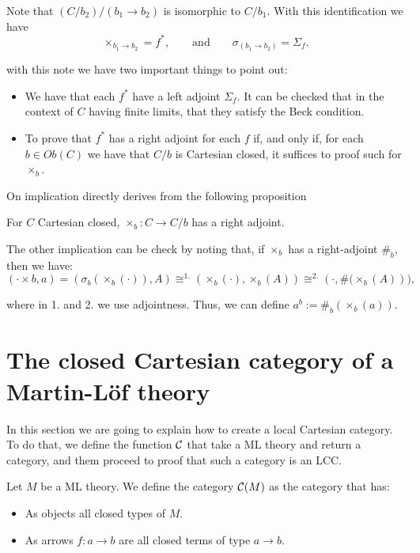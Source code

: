 Note that $(C/b_2)/(b_1\to b_2)$ is isomorphic to $C/b_1$. With this identification we have $$\times_{b_1\to b_2} = f^*,\qquad \text{and} \qquad\sigma_{(b_1\to b_2)} = \Sigma_f.$$

with this note we have two important things to point out:
\begin{itemize}
\item We have that each $f^*$ have a left adjoint $\Sigma_f$. It can be checked that in the context of $C$ having finite limits, that they satisfy the Beck condition. 
\item To prove that $f^*$ has a right adjoint for each $f$ if, and only if, for each $b\in Ob(C)$ we have that $C/b$ is Cartesian closed, it suffices to proof such for $\times_b$.\\
\end{itemize}

On implication directly derives from the following proposition
\begin{proposition}
  For $C$ Cartesian closed, $\times_b: C\to C/b$ has a right adjoint.
\end{proposition}

The other implication can be check by noting that, if $\times_b$ has a right-adjoint $\#_b$, then we have:
$$(\cdot \times b, a) = \left( \sigma_b(\times_b(\cdot)), A\right) \cong^{1.} \left( \times_b(\cdot), \times_b(A)\right)  \cong^{2.} \left( \cdot, \#(\times_b(A)\right)), $$

where in 1. and 2. we use adjointness. Thus, we can define $a^b:= \#_b(\times_b(a))$.


\section{The closed Cartesian category of a Martin-L\"of theory}
\label{InternalLCC}
In this section we are going to explain how to create a local Cartesian category. To do that, we define the function $\mathcal{C}$ that take a ML theory and return a category, and them proceed to proof that such a category is an LCC.

\begin{definition}
  Let $M$ be a ML theory. We define the category $\mathcal{C}(M)$ as the category that has:
  \begin{itemize}
  \item As objects all closed types of $M$.
  \item As arrows $f:a\to b$ are all closed terms of type $a\to b$.
  \end{itemize}
\end{definition}

